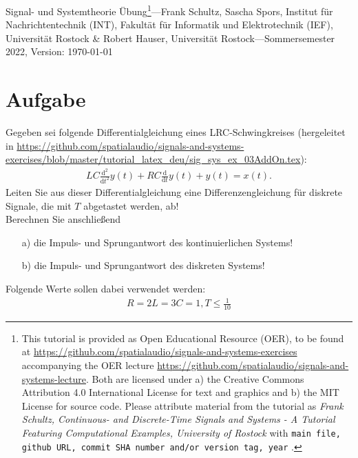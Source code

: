 \documentclass[11pt,a4paper,DIV=12]{scrartcl}
\begin{document}
	\noindent Signal- und Systemtheorie Übung\footnote{This tutorial is provided as
		Open Educational Resource (OER), to be found at
		\url{https://github.com/spatialaudio/signals-and-systems-exercises}
		accompanying the OER lecture
		\url{https://github.com/spatialaudio/signals-and-systems-lecture}.
		Both are licensed under a) the Creative Commons Attribution 4.0 International
		License for text and graphics and b) the MIT License for source code.
		Please attribute material from the tutorial as \textit{Frank Schultz,
			Continuous- and Discrete-Time Signals and Systems - A Tutorial Featuring
			Computational Examples, University of Rostock} with
		\texttt{main file, github URL, commit SHA number and/or version tag, year}
		.}---Frank Schultz, Sascha Spors,
	Institut für Nachrichtentechnik (INT),
	Fakultät für Informatik und Elektrotechnik (IEF),
	Universität Rostock \&
	Robert Hauser, Universität Rostock---Sommersemester 2022, Version: \today
	
\section{Aufgabe}
Gegeben sei folgende Differentialgleichung eines LRC-Schwingkreises (hergeleitet in \url{https://github.com/spatialaudio/signals-and-systems-exercises/blob/master/tutorial_latex_deu/sig_sys_ex_03AddOn.tex}):
\begin{gather}
	LC \frac{\mathrm{d} ^2}{\mathrm{d} t^2}y(t)+RC\frac{\mathrm{d}}{\mathrm{d} t}y(t)+y(t)=x(t).
\end{gather}
Leiten Sie aus dieser Differentialgleichung eine Differenzengleichung für diskrete Signale, die mit $T$ abgetastet werden, ab!\\
Berechnen Sie anschließend
\begin{itemize}
	\item[a) ] die Impuls- und Sprungantwort des kontinuierlichen Systems!
	\item[b) ] die Impuls- und Sprungantwort des diskreten Systems! 
\end{itemize}
Folgende Werte sollen dabei verwendet werden:
\begin{gather}
	R=2L=3C=1,
	T\leq\frac{1}{10}
\end{gather}
\end{document}
